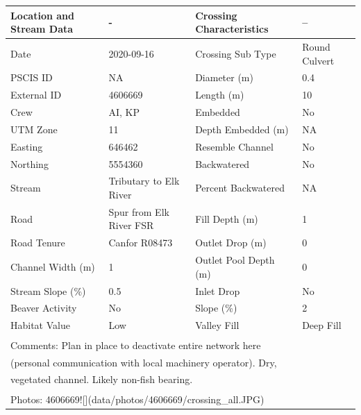 \documentclass[
]{book}
\begin{document}
\begin{tabular}{llll}
\toprule
Location and Stream Data & - & Crossing Characteristics & --\\
\midrule
Date & 2020-09-16 & Crossing Sub Type & Round Culvert\\
PSCIS ID & NA & Diameter (m) & 0.4\\
External ID & 4606669 & Length (m) & 10\\
Crew & AI, KP & Embedded & No\\
UTM Zone & 11 & Depth Embedded (m) & NA\\
\addlinespace
Easting & 646462 & Resemble Channel & No\\
Northing & 5554360 & Backwatered & No\\
Stream & Tributary to Elk River & Percent Backwatered & NA\\
Road & Spur from Elk River FSR & Fill Depth (m) & 1\\
Road Tenure & Canfor R08473 & Outlet Drop (m) & 0\\
\addlinespace
Channel Width (m) & 1 & Outlet Pool Depth (m) & 0\\
Stream Slope (\%) & 0.5 & Inlet Drop & No\\
Beaver Activity & No & Slope (\%) & 2\\
Habitat Value & Low & Valley Fill & Deep Fill\\
\bottomrule
\multicolumn{4}{l}{\textsuperscript{} Comments: Plan in place to deactivate entire network here}\\
\multicolumn{4}{l}{(personal communication with local machinery operator). Dry,}\\
\multicolumn{4}{l}{vegetated channel. Likely non-fish bearing.}\\
\multicolumn{4}{l}{\textsuperscript{} Photos: 4606669![](data/photos/4606669/crossing\_all.JPG)}\\
\end{tabular}
\end{document}
